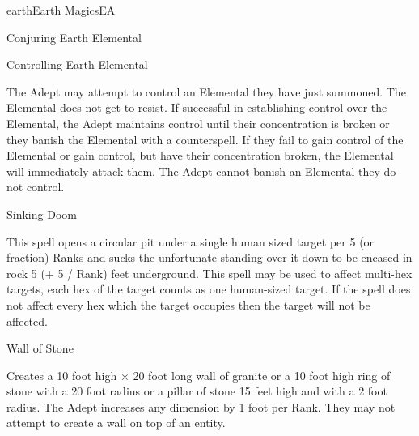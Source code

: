 \begin{College}[1.2]{earth}{Earth Magics}{EA}
\begin{spell}[S-10]{Conjuring Earth Elemental}
\begin{effects}
\end{effects}
\end{spell}

\begin{spell}[S-11]{Controlling Earth Elemental}

\begin{effects}
The Adept may attempt to control an Elemental they have just summoned.
The Elemental does not get to resist.  If successful in establishing
control over the Elemental, the Adept maintains control until their
concentration is broken or they banish the Elemental with a
counterspell.  If they fail to gain control of the Elemental or gain
control, but have their concentration broken, the Elemental will
immediately attack them.  The Adept cannot banish an Elemental they do
not control.

\end{effects}
\end{spell}

\begin{spell}[S-12]{Sinking Doom}

\begin{effects}
This spell opens a circular pit under a single human sized target per
5 (or fraction) Ranks and sucks the unfortunate standing over it down
to be encased in rock 5 (+ 5 / Rank) feet underground.  This spell may
be used to affect multi-hex targets, each hex of the target counts as
one human-sized target. If the spell does not affect every hex which
the target occupies then the target will not be affected.
\end{effects}
\end{spell}

\begin{spell}[S-13]{Wall of Stone}
\begin{effects}
Creates a 10 foot high × 20 foot long wall of granite or a 10 foot
high ring of stone with a 20 foot radius or a pillar of stone 15 feet
high and with a 2 foot radius. The Adept increases any dimension by 1
foot per Rank. They may not attempt to create a wall on top of an
entity.
\end{effects}
\end{spell}


\end{College}
